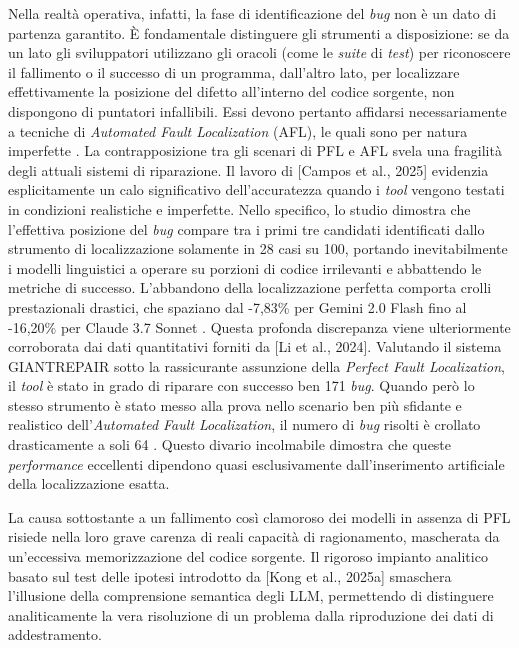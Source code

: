 Nella realtà operativa, infatti, la fase di identificazione del \textit{bug} non è un dato di 
partenza garantito. È fondamentale distinguere gli strumenti a disposizione: se da un lato gli 
sviluppatori utilizzano gli oracoli (come le \textit{suite} di \textit{test}) per riconoscere 
il fallimento o il successo di un programma, dall'altro lato, per localizzare effettivamente la 
posizione del difetto all'interno del codice sorgente, non dispongono di puntatori infallibili. 
Essi devono pertanto affidarsi necessariamente a tecniche di \textit{Automated Fault Localization} (AFL),
le quali sono per natura imperfette \cite{li2024hybrid}.
La contrapposizione tra gli scenari di PFL e AFL svela una fragilità degli
attuali sistemi di riparazione. Il lavoro di [Campos et al., 2025] evidenzia esplicitamente
un calo significativo dell'accuratezza quando i \textit{tool} vengono testati in condizioni
realistiche e imperfette.
Nello specifico, lo studio dimostra che l'effettiva posizione del \textit{bug} compare tra i primi
tre candidati identificati dallo strumento di localizzazione solamente in 28 casi su 100,
portando inevitabilmente i modelli linguistici a operare su porzioni di codice irrilevanti
e abbattendo le metriche di successo.
L'abbandono della localizzazione perfetta comporta crolli prestazionali drastici, che
spaziano dal -7,83\% per Gemini 2.0 Flash fino al -16,20\% per Claude 3.7 Sonnet \cite{campos2025exploring}.
Questa profonda discrepanza viene ulteriormente corroborata dai dati quantitativi
forniti da [Li et al., 2024].
Valutando il sistema GIANTREPAIR sotto la rassicurante assunzione della
\textit{Perfect Fault Localization}, il \textit{tool} è stato in grado di riparare con successo
ben 171 \textit{bug}.
Quando però lo stesso strumento è stato messo alla prova nello scenario ben più
sfidante e realistico dell'\textit{Automated Fault Localization}, il numero di
\textit{bug} risolti è crollato drasticamente a soli 64 \cite{li2024hybrid}.
Questo divario incolmabile dimostra che queste \textit{performance} eccellenti
dipendono quasi esclusivamente dall'inserimento artificiale della localizzazione esatta.

La causa sottostante a un fallimento così clamoroso dei modelli in assenza di PFL
risiede nella loro grave carenza di reali capacità di ragionamento, mascherata
da un'eccessiva memorizzazione del codice sorgente.
Il rigoroso impianto analitico basato sul test delle ipotesi introdotto da [Kong et al., 2025a]
smaschera l'illusione della comprensione semantica degli LLM, permettendo di distinguere
analiticamente la vera risoluzione di un problema dalla riproduzione dei dati
di addestramento. \cite{kong2025demystifying}

